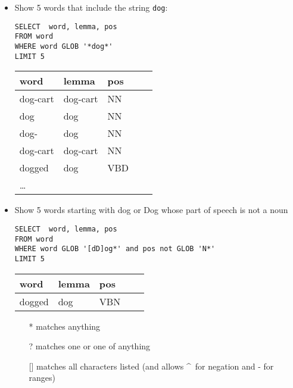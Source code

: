 \documentclass[a4paper,landscape,headrule,footrule,xetex]{foils}
\begin{document}

\begin{itemize}
\item Show 5 words that include the string \texttt{dog}:
\begin{verbatim}
SELECT  word, lemma, pos
FROM word
WHERE word GLOB '*dog*'
LIMIT 5
\end{verbatim}
  \begin{tabular}{lllll}
    \textbf{word}  & \textbf{lemma}  &  \textbf{pos} \\ \hline
dog-cart   & dog-cart   &  NN      \\  
dog        & dog        &  NN    \\    
dog-       & dog        &  NN   \\     
dog-cart   & dog-cart   &  NN   \\     
dogged     & dog        &  VBD   \\
    \ldots
  \end{tabular}
\end{itemize}


\begin{itemize}
\item Show 5 words starting with dog or Dog whose part of speech is not a noun
\begin{verbatim}
SELECT  word, lemma, pos
FROM word
WHERE word GLOB '[dD]og*' and pos not GLOB 'N*'
LIMIT 5
\end{verbatim}
  \begin{tabular}{lllll}
    \textbf{word}  & \textbf{lemma}  &  \textbf{pos} \\ \hline
    dogged  & dog &  VBN \\
  \end{tabular}
\begin{itemize}
\item[*] matches anything
\item[?] matches one or one of anything
\item[{[]}] matches all characters listed (and allows \textasciicircum\ for negation and - for ranges)
\end{itemize}
\end{itemize}

\end{document}
